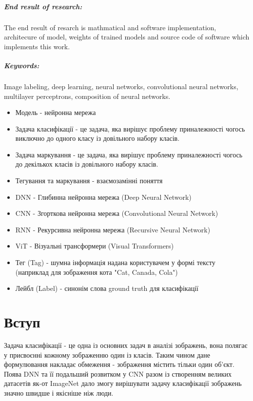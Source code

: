 \documentclass{udstu}
\begin{document}
\paragraph{\textbf{End result of research:}}
The end result of resarch is mathmatical and software implementation, architecure of model,
weights of trained models and source code of software which implements this work.

\paragraph{\textbf{Keywords:}}
Image labeling, deep learning, neural networks, convolutional neural networks,
multilayer perceptrons, composition of neural networks.


\shortings

\begin{itemize}[*]
	\item Модель - нейронна мережа
	\item Задача класифікації - це задача, яка вирішує проблему приналежності чогось
	виключно до одного класу із довільного набору класів.
	\item Задача маркування - це задача, яка вирішує проблему приналежності чогось
	до декількох класів із довільного набору класів.
	\item Тегування та маркування - взаємозамінні поняття
	\item DNN - Глибинна нейронна мережа (Deep Neural Network)
	\item CNN - Згорткова нейронна мережа (Convolutional Neural Network)
	\item RNN - Рекурсивна нейронна мережа (Recursive Neural Network)
	\item ViT - Візуальні трансформери (Visual Transformers)
	\item Тег (Tag) - шумна інформація надана користувачем у формі тексту
	(наприклад для зображення кота "Cat, Canada, Cola")
	\item Лейбл (Label) - синонім слова ground truth для класифікації
\end{itemize}


\tableofcontents


\chapter{Вступ}

Задача класифікації - це одна із основних задач в аналізі зображень, вона полягає
у присвоєнні кожному зображенню один із класів. Таким чином дане формулювання накладає
обмеження - зображення містить тільки один об'єкт. Поява DNN \cite{dnn-cls}
та її подальший розвитком у CNN \cite{cnn-cls-1,cnn-cls-2} разом із створенням
великих датасетів як-от ImageNet \cite{deng2009imagenet} дало змогу вирішувати задачу
класифікації зображень значно швидше і якісніше ніж люди.
\end{document}
